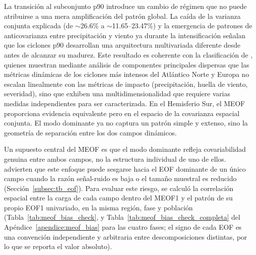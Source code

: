 La transición al subconjunto p90 introduce un cambio de régimen que no puede atribuirse a una mera amplificación del patrón global.
La caída de la varianza conjunta explicada (de ${\sim}$26.6\% a ${\sim}$11.65--23.47\%) y la emergencia de patrones de anticovarianza entre precipitación y viento ya durante la intensificación señalan que los ciclones p90 desarrollan una arquitectura multivariada diferente desde antes de alcanzar su madurez.
Este resultado es coherente con la clasificación de \citet{corner2025classification}, quienes muestran mediante análisis de componentes principales dispersas que las métricas dinámicas de los ciclones más intensos del Atlántico Norte y Europa no escalan linealmente con las métricas de impacto (precipitación, huella de viento, severidad), sino que exhiben una multidimensionalidad que requiere varias medidas independientes para ser caracterizada.
En el Hemisferio Sur, el MEOF proporciona evidencia equivalente pero en el espacio de la covarianza espacial conjunta. El modo dominante ya no captura un patrón simple y extenso, sino la geometría de separación entre los dos campos dinámicos.

Un supuesto central del MEOF es que el modo dominante refleja covariabilidad genuina entre ambos campos, no la estructura individual de uno de ellos. \citet{bretherton1992intercomparison} advierten que este enfoque puede sesgarse hacia el EOF dominante de un único campo cuando la razón señal-ruido es baja o el tamaño muestral es reducido (Sección~\ref{subsec:tb_eof}). Para evaluar este riesgo, se calculó la correlación espacial entre la carga de cada campo dentro del MEOF1 y el patrón de su propio EOF1 univariado, en la misma región, fase y población (Tabla~\ref{tab:meof_bias_check}, y Tabla~\ref{tab:meof_bias_check_completa} del Apéndice~\ref{apendice:meof_bias} para las cuatro fases; el signo de cada EOF es una convención independiente y arbitraria entre descomposiciones distintas, por lo que se reporta el valor absoluto).



